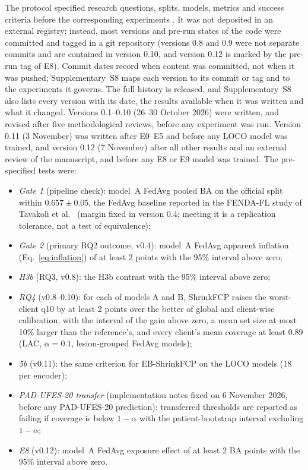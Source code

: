 \documentclass[VANCOUVER,Times1COL]{WileyNJDv5}
\begin{document}
The protocol specified research questions, splits, models, metrics and success criteria before the
corresponding experiments \cite{nosek2018preregistration}. It was not deposited in an external registry;
instead, most versions and pre-run states of the code were committed and tagged in a git repository (versions 0.8 and 0.9 were not separate commits and are contained in version 0.10, and version 0.12 is marked by the pre-run tag of E8). Commit dates record when content was committed, not when it was pushed; Supplementary~S8 maps each version to its commit or tag and to the experiments it governs. The full history is released, and Supplementary~S8 also lists every version with its date, the results available when it was written and what it changed. Versions 0.1--0.10
(26--30 October 2026) were written, and revised after five methodological reviews, before any experiment
was run. Version 0.11 (3 November) was written after E0--E5 and before any LOCO model was trained, and
version 0.12 (7 November) after all other results and an external review of the manuscript, and before
any E8 or E9 model was trained. The pre-specified tests were:
\begin{itemize}
  \item \emph{Gate 1} (pipeline check): model~A FedAvg pooled BA on the official split within
    $0.657\pm0.05$, the FedAvg baseline reported in the FENDA-FL study of Tavakoli et al.\
    \cite{tavakoli2024fendafl} (margin fixed in version 0.4; meeting it is a replication tolerance, not
    a test of equivalence);
  \item \emph{Gate 2} (primary RQ2 outcome, v0.4): model~A FedAvg apparent inflation
    (Eq.~\ref{eq:inflation}) of at least 2 points with the 95\% interval above zero;
  \item \emph{H3b} (RQ3, v0.8): the H3b contrast with the 95\% interval above zero;
  \item \emph{RQ4} (v0.8--0.10): for each of models A and B, ShrinkFCP raises the worst-client q10 by at
    least 2 points over the better of global and client-wise calibration, with the interval of the gain
    above zero, a mean set size at most 10\% larger than the reference's, and every client's mean coverage
    at least 0.89 (LAC, $\alpha=0.1$, lesion-grouped FedAvg models);
  \item \emph{5b} (v0.11): the same criterion for EB-ShrinkFCP on the LOCO models (18 per encoder);
  \item \emph{PAD-UFES-20 transfer} (implementation notes fixed on 6 November 2026, before any
    PAD-UFES-20 prediction): transferred thresholds are reported as failing if coverage is below
    $1-\alpha$ with the patient-bootstrap interval excluding $1-\alpha$;
  \item \emph{E8} (v0.12): model~A FedAvg exposure effect of at least 2 BA points with the 95\% interval
    above zero.
\end{itemize}
\end{document}
